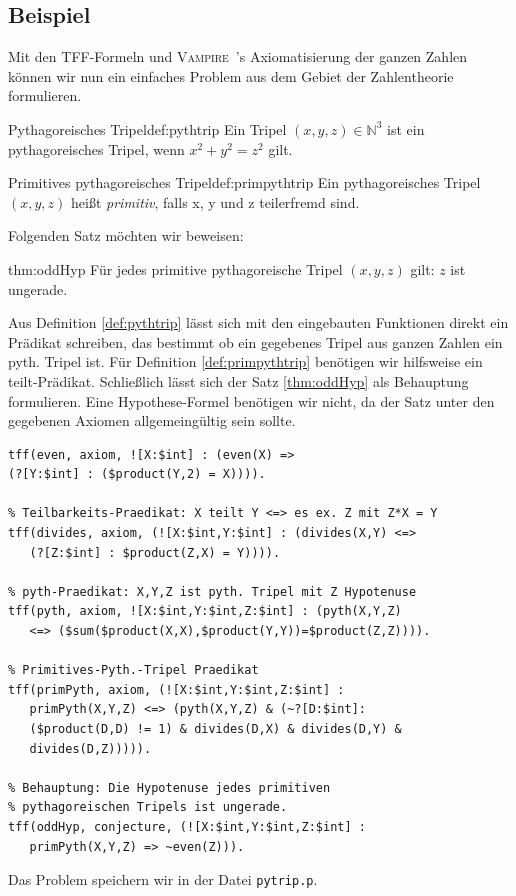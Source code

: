 \documentclass{article}
\newcommand{\vampire}{\textsc{Vampire}~}
\begin{document}
\subsection{Beispiel}
\label{subsec:tptpexample}

Mit den TFF-Formeln und \vampire's Axiomatisierung der ganzen Zahlen können wir nun 
ein einfaches Problem aus dem Gebiet der Zahlentheorie formulieren.

\begin{definition}{Pythagoreisches Tripel}{def:pythtrip}
	Ein Tripel $(x, y, z) \in \mathds{N}^3$ ist ein pythagoreisches Tripel, wenn
	$x^2+y^2=z^2$ gilt.
\end{definition}
\begin{definition}{Primitives pythagoreisches Tripel}{def:primpythtrip}
	Ein pythagoreisches Tripel $(x, y, z)$ heißt \emph{primitiv}, falls x, y und z teilerfremd sind.
\end{definition}
Folgenden Satz möchten wir beweisen:
\begin{theorem}{}{thm:oddHyp}
	Für jedes primitive pythagoreische Tripel $(x, y, z)$ gilt: $z$ ist ungerade.
\end{theorem}
Aus Definition \ref{def:pythtrip} lässt sich mit den eingebauten Funktionen direkt ein Prädikat schreiben, das bestimmt ob ein gegebenes Tripel aus ganzen Zahlen ein pyth. Tripel ist.
Für Definition \ref{def:primpythtrip} benötigen wir hilfsweise ein teilt-Prädikat.
Schließlich lässt sich der Satz \ref{thm:oddHyp} als Behauptung formulieren. 
Eine Hypothese-Formel benötigen wir nicht, da der Satz unter den gegebenen Axiomen allgemeingültig sein sollte.
\begin{lstlisting}[language=tptp]
% even-Praedikat: X ist gerade
tff(even, axiom, ![X:$int] : (even(X) =>
(?[Y:$int] : ($product(Y,2) = X)))).

% Teilbarkeits-Praedikat: X teilt Y <=> es ex. Z mit Z*X = Y
tff(divides, axiom, (![X:$int,Y:$int] : (divides(X,Y) <=>
   (?[Z:$int] : $product(Z,X) = Y)))).

% pyth-Praedikat: X,Y,Z ist pyth. Tripel mit Z Hypotenuse
tff(pyth, axiom, ![X:$int,Y:$int,Z:$int] : (pyth(X,Y,Z)
   <=> ($sum($product(X,X),$product(Y,Y))=$product(Z,Z)))).

% Primitives-Pyth.-Tripel Praedikat
tff(primPyth, axiom, (![X:$int,Y:$int,Z:$int] : 
   primPyth(X,Y,Z) <=> (pyth(X,Y,Z) & (~?[D:$int]: 
   ($product(D,D) != 1) & divides(D,X) & divides(D,Y) & 
   divides(D,Z))))).

% Behauptung: Die Hypotenuse jedes primitiven 
% pythagoreischen Tripels ist ungerade.
tff(oddHyp, conjecture, (![X:$int,Y:$int,Z:$int] : 
   primPyth(X,Y,Z) => ~even(Z))).
\end{lstlisting}
Das Problem speichern wir in der Datei \verb|pytrip.p|.
\end{document}
